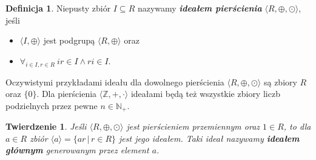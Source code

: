 \documentclass[declaration,shortabstract]{iithesis}
\theoremstyle{definition}
\newtheorem{definition}{Definicja}
\theoremstyle{remark} \newtheorem{observation}{Obserwacja}
\theoremstyle{plain} \newtheorem{theorem}{Twierdzenie}
\theoremstyle{plain} \newtheorem{lemma}{Lemat}
\theoremstyle{remark} \newtheorem*{remark*}{Uwaga}
\theoremstyle{reminder} \newtheorem*{reminder*}{Przypomnienie}
\begin{document}
\theoremstyle{definition}
\begin{definition}
	Niepusty zbiór $I \subseteq R$ nazywamy \textbf{\textit{ideałem pierścienia}} $\langle R, \oplus, \odot \rangle$, jeśli
	\begin{itemize}[leftmargin=.5in]
		\item $\langle I, \oplus \rangle$ jest podgrupą $\langle R, \oplus \rangle$ oraz
		\item $\forall_{i \in I, r \in R} \: ir \in I \wedge ri \in I $.
	\end{itemize}
\end{definition}

Oczywistymi przykładami ideału dla dowolnego pierścienia $\langle R, \oplus, \odot \rangle$ są zbiory $R$ oraz $\{0\}$. Dla pierścienia $\langle \mathbb{Z}, +, \cdot \rangle$ ideałami będą też wszystkie zbiory liczb podzielnych przez pewne $n \in \mathbb{N}_+$.

\theoremstyle{theorem}
\begin{theorem}
	Jeśli $\langle R, \oplus, \odot \rangle$ jest pierścieniem przemiennym oraz $1 \in R$, to dla $a \in R$ zbiór $\langle a \rangle = \{ ar \, | \, r \in R  \}$ jest jego ideałem. Taki ideał nazywamy \textit{\textbf{ideałem głównym}} generowanym przez element $a$.
\end{theorem}
\end{document}

